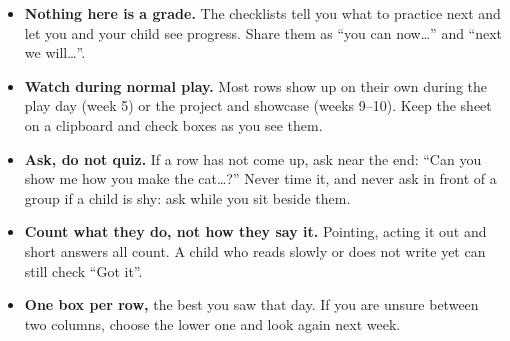 
\begin{teachernote}
\begin{itemize}[itemsep=1pt]
  \item \textbf{Nothing here is a grade.} The checklists tell you what to practice next and let you
        and your child see progress. Share them as \enquote{you can now\dots} and \enquote{next we will\dots}.
  \item \textbf{Watch during normal play.} Most rows show up on their own during the play day (week 5)
        or the project and showcase (weeks 9--10). Keep the sheet on a clipboard and check boxes as you see them.
  \item \textbf{Ask, do not quiz.} If a row has not come up, ask near the end:
        \enquote{Can you show me how you make the cat\dots?} Never time it, and never ask in front of
        a group if a child is shy: ask while you sit beside them.
  \item \textbf{Count what they do, not how they say it.} Pointing, acting it out and short answers all count.
        A child who reads slowly or does not write yet can still check \enquote{Got it}.
  \item \textbf{One box per row,} the best you saw that day. If you are unsure between two columns,
        choose the lower one and look again next week.
\end{itemize}
\end{teachernote}

\newcommand{\smguide}[5]{%
  \par\needspace{7\baselineskip}\noindent\textbf{\color{kcaccent}#1}\par
  \begin{itemize}[leftmargin=1.4em,itemsep=1pt,topsep=2pt]
    \item[\faSeedling] \textbf{Not yet:} #2
    \item[\faShoePrints] \textbf{Getting there:} #3
    \item[\faCheckCircle] \textbf{Got it:} #4
    \item[\faArrowRight] \textbf{If not yet:} #5
  \end{itemize}\medskip}

